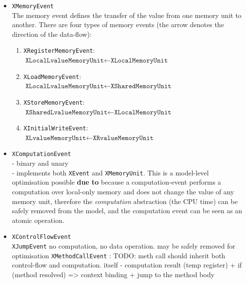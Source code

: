 \begin{itemize}
  \item \texttt{XMemoryEvent} \\
  The memory event defines the transfer of the value from one memory unit to another.
  There are four types of memory events (the arrow denotes the direction of the data-flow):
  \begin{enumerate}
  \item \texttt{XRegisterMemoryEvent}: \\
    $\texttt{XLocalLvalueMemoryUnit} \leftarrow \texttt{XLocalMemoryUnit}$
  \item \texttt{XLoadMemoryEvent}: \\
    $\texttt{XLocalLvalueMemoryUnit} \leftarrow \texttt{XSharedMemoryUnit}$
  \item \texttt{XStoreMemoryEvent}: \\
    $\texttt{XSharedLvalueMemoryUnit} \leftarrow \texttt{XLocalMemoryUnit}$
  \item \texttt{XInitialWriteEvent}: \\
    $\texttt{XLvalueMemoryUnit} \leftarrow \texttt{XRvalueMemoryUnit}$

  \end{enumerate}%
  
  \item \texttt{XComputationEvent} \\
  - binary and unary \\
  - implements both \texttt{XEvent} and \texttt{XMemoryUnit}.
  This is a model-level optimisation possible \textbf{due to} because a computation-event
  performs a computation over local-only memory and does not change the value of any memory unit, therefore the \textit{computation} abstraction (the CPU time) can be safely removed from the model, and the computation event can be seen as an atomic operation.
  
  \item \texttt{XControlFlowEvent} \\
    \texttt{XJumpEvent} no computation, no data operation. may be safely removed for optimisation
    \texttt{XMethodCallEvent} : TODO: meth call should inherit both control-flow and computation.
    itself - computation result (temp register) + if (method resolved) => context binding + jump to the method body 
    

\end{itemize}
